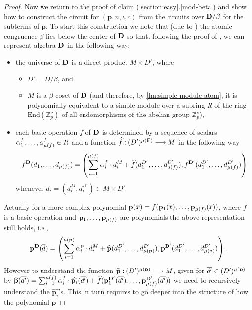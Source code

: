 \documentclass[11pt,a4paper]{amsart}
\newcommand{\m}[1]{{\uppercase {\bf{#1}}}}
\newcommand{\po}[1]{{\mathbf {#1}}}
\newcounter{note}
\newcounter{claim}
\renewcommand{\o}[1]{\overline {#1}}
\newcommand{\map}{\longrightarrow}
\newcommand{\h}[1]{\widehat{#1}}
\newcommand{\cc}{c}
\newcommand{\z}{\mathbb{Z}}
\newcommand{\matr}[2]{\mbox{End}{\left(\z_{#1}^{#2}\right)}}
\newcommand{\progg}[4]{\left(#1,#2,#3,#4\right)}
\begin{document}
\begin{proof}
\medskip

Now we return to the proof of claim (\ref{section:easy}.\ref{mod-beta})
and show how to construct the circuit for $\progg{\po p}{n}{\iota}{\cc}$
from the circuits over $\m D/\beta$ for the subterms of $\po p$.
To start this construction we note that (due to \cite[Exercise 7.3]{fm})
the atomic congruence $\beta$ lies below the center of $\m D$ so that,
following the proof of \cite[Theorem 7.1]{fm}, we can represent algebra $\m D$
in the following way:
\begin{itemize}
  \item the universe of $\m D$ is a direct product $M\times D'$, where
  \begin{itemize}
    \item $D'=D/\beta$, and
    \item $M$ is a $\beta$-coset of $\m D$
        (and therefore, by \cref{lm:simple-module-atom}, it is polynomially equivalent
        to a simple module over a subring $R$ of the ring $\matr{p}{\nu}$ of all endomorphisms of the abelian group $\z_p^\nu$),
  \end{itemize}
  \item each basic operation $f$ of $\m D$ is determined by
    a sequence of scalars $\alpha^f_1,\ldots,\alpha^f_{\mu\left({f}\right)} \in R$
    and a function $\h f: (D')^{\maxar f} \map M$ in the following way
\begin{equation}\label{rec:basic}
    f^{\m D}(d_1,\ldots,d_{\ar f}) =
    \left(
    \sum_{i=1}^{\ar f} \alpha^f_i\cdot d^M_i +\h f(d_1^{D'},\ldots,d_{\ar f}^{D'}),
    f^{\m D'}(d_1^{D'},\ldots,d_{\ar f}^{D'})
    \right)
\end{equation}
    whenever $d_i=(d_i^M,d_i^{D'})\in M\times D'$.
\end{itemize}
Actually for a more complex polynomial $\po p(\o x) = f(\po p_1(\o x),\ldots,\po p_{\ar f}(\o x))$,
where $f$ is a basic operation and $\po p_1,\ldots,\po p_{\ar f}$ are polynomials the above representation still holds, i.e.,
\[
\po p^{\m D}(\o d) =
\left(
    \sum_{i=1}^{\ar{\po p}} \alpha^{\po p}_i\cdot d^M_i +
    \h {\po p}(d_1^{D'},\ldots,d_{\ar{\po p}}^{D'}),
    \po p^{\m D'}(d_1^{D'},\ldots,d_{\ar{\po p}}^{D'})
\right).
\]
However to understand the function $\h{\po p} : (D')^{\ar{\po p}} \map M$,
given for $\o{d'} \in (D')^{\ar{\po p}}$ by
$\h{\po p}(\o{d'}) = \sum_{i=1}^{\ar f} \alpha^f_i\cdot\h{\po p_i}(\o{d'})+
\h{f}(\po p_1^{\m D'}(\o{d'}),\dots,\po p_{\ar{f}}^{\m D'}(\o{d'}))$
we need to recursively understand the $\h{\po p_i}$'s.
This in turn requires to go deeper into the structure of how the polynomial $\po p$

\end{proof}
\end{document}
